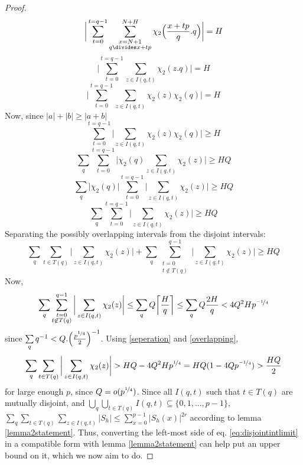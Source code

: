 \documentclass{report}
\begin{document}
\begin{proof}
$$\bigg \lvert\sum\limits_{t=0}^{t=q-1}\sum\limits_{\substack{x=N+1\\q\divides x+tp}}^{N+H} \chi_2 \Big(\frac{x+tp}{q}.q\Big)\bigg \rvert=H$$
$$\bigg \lvert\sum\limits_{t=0}^{t=q-1}\sum\limits_{z\in I(q,t)}\chi_2(z.q)\bigg \rvert=H$$
$$\bigg \lvert\sum\limits_{t=0}^{t=q-1}\sum\limits_{z\in I(q,t)}\chi_2(z)\chi_2(q)\bigg \rvert=H$$
Now, since $\lvert a\rvert + \lvert b\rvert \geq \lvert a+b \rvert$
$$\sum\limits_{t=0}^{t=q-1}\bigg \lvert\sum\limits_{z\in I(q,t)}\chi_2(z)\chi_2(q)\bigg \rvert \geq H$$
$$\sum_q\sum\limits_{t=0}^{t=q-1}\bigg \lvert\chi_2(q)\sum\limits_{z\in I(q,t)}\chi_2(z)\bigg \rvert \geq HQ$$
$$\sum_q\bigg \lvert\chi_2(q)\bigg\rvert\sum\limits_{t=0}^{t=q-1}\bigg\lvert\sum\limits_{z\in I(q,t)}\chi_2(z)\bigg \rvert \geq HQ$$
$$\sum_q\sum\limits_{t=0}^{t=q-1}\bigg \lvert\sum\limits_{z\in I(q,t)}\chi_2(z)\bigg \rvert \geq HQ$$
Separating the possibly overlapping intervals from the disjoint intervals:
\begin{equation} \label{seperation}
\sum_q\sum\limits_{t\in T(q)}\bigg \lvert\sum\limits_{z\in I(q,t)}\chi_2(z)\bigg \rvert+\sum_q\sum\limits_{\substack{t=0\\t\not \in T(q)}}^{q-1}\bigg \lvert\sum\limits_{z\in I(q,t)}\chi_2(z)\bigg \rvert \geq HQ
\end{equation}
Now,
\begin{equation} \label{overlapping}
\sum_q\sum\limits_{\substack{t=0\\t\not \in T(q)}}^{q-1}\bigg\lvert\sum\limits_{z\in I(q,t) }\chi_2(z)\bigg \rvert \leq \sum\limits_q Q\bigg\lceil\frac{H}{q}\bigg\rceil \leq \sum\limits_q Q\frac{2H}{q} < 4Q^2 Hp^{\nicefrac{-1}{4}}
\end{equation}
since $\sum\limits_q q^{-1} < Q.\Big(\frac{p^{\nicefrac{1}{4}}}{2}\Big)^{-1}$. Using \ref{seperation} and \ref{overlapping},
\begin{equation} \label{eq:disjointintlimit}
\sum_q\sum\limits_{t\in T(q)}\bigg \lvert\sum\limits_{z\in I(q,t)}\chi_2(z)\bigg \rvert > HQ - 4Q^2 Hp^{\nicefrac{1}{4}}=HQ(1-4Qp^{\nicefrac{-1}{4}})>\frac{HQ}{2}
\end{equation}
for large enough $p$, since $Q=o(p^{\nicefrac{1}{4}})$. Since all $I(q,t)$ such that $t\in T(q)$ are mutually disjoint, and $\bigcup\limits_q\bigcup\limits_{t\in T(q)} I(q,t) \subseteq \{0,1,...,p-1\}$, $\sum\limits_q\sum\limits_{t\in T(q)}\sum\limits_{z\in I(q,t)}\lvert S_h \rvert \leq \sum\limits_{x=0}^{p-1}\lvert S_h(x)\rvert ^{2r}$ according to lemma \ref{lemma2statement}. Thus, converting the left-most side of eq. \ref{eq:disjointintlimit} in a compatible form with lemma \ref{lemma2statement} can help put an upper bound on it, which we now aim to do.

\end{proof}
\end{document}
